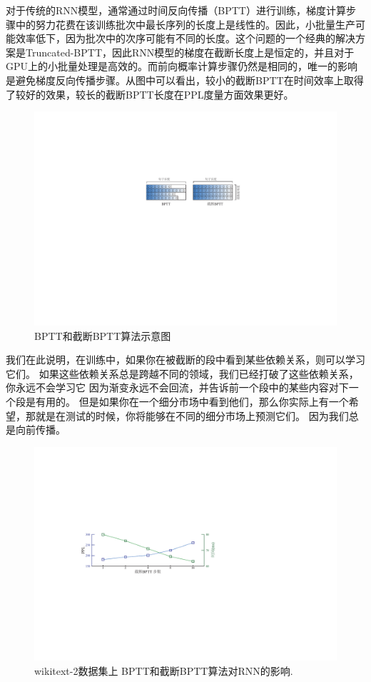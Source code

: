 对于传统的RNN模型，通常通过时间反向传播（BPTT）进行训练，梯度计算步骤中的努力花费在该训练批次中最长序列的长度上是线性的。因此，小批量生产可能效率低下，因为批次中的次序可能有不同的长度。这个问题的一个经典的解决方案是Truncated-BPTT，因此RNN模型的梯度在截断长度上是恒定的，并且对于GPU上的小批量处理是高效的。而前向概率计算步骤仍然是相同的，唯一的影响是避免梯度反向传播步骤。从图中可以看出，较小的截断BPTT在时间效率上取得了较好的效果，较长的截断BPTT长度在PPL度量方面效果更好。
\begin{figure}[!h]
  \centering
  \includegraphics[width=1\columnwidth]{./figures/minibatch.pdf}
  \caption{BPTT和截断BPTT算法示意图}\label{fig:minibatch}
\end{figure}

我们在此说明，在训练中，如果你在被截断的段中看到某些依赖关系，则可以学习它们。 如果这些依赖关系总是跨越不同的领域，我们已经打破了这些依赖关系，你永远不会学习它 因为渐变永远不会回流，并告诉前一个段中的某些内容对下一个段是有用的。 但是如果你在一个细分市场中看到他们，那么你实际上有一个希望，那就是在测试的时候，你将能够在不同的细分市场上预测它们。 因为我们总是向前传播。
\begin{figure}[!h]
  \centering
  \includegraphics[width=1\columnwidth]{./figures/tbptt.pdf}
  \caption{wikitext-2数据集上 BPTT和截断BPTT算法对RNN的影响.}\label{fig:tbptt}
\end{figure}
